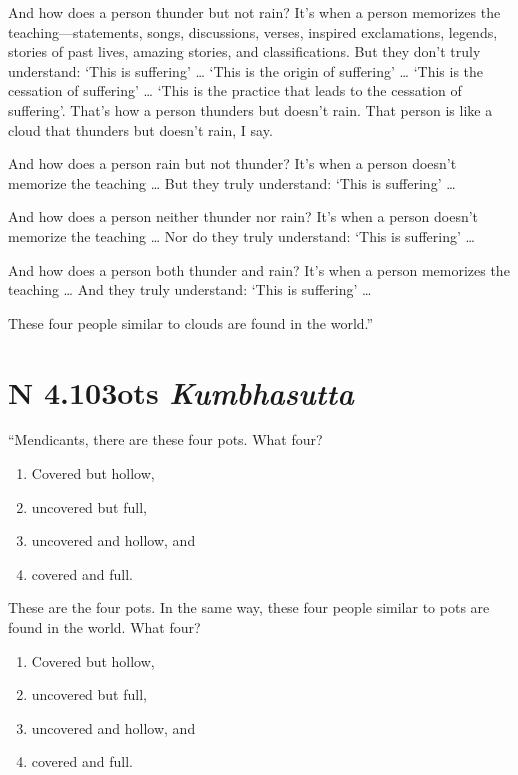 \documentclass[12pt,openany]{book}%
\newcommand*{\suttatitleacronym}[1]{\smaller[2]{#1}\vspace*{.3em}}
\newcommand*{\suttatitletranslation}[1]{\linebreak{#1}}
\newcommand*{\suttatitleroot}[1]{\linebreak\smaller[2]\itshape{#1}}
\newcommand*{\tocacronym}[1]{\hspace*{-3.3em}{#1}\quad}
\newcommand*{\toctranslation}[1]{#1}
\newcommand*{\tocroot}[1]{(\textit{#1})}
\begin{document}
And how does a person thunder but not rain? It’s when a person memorizes the teaching—statements, songs, discussions, verses, inspired exclamations, legends, stories of past lives, amazing stories, and classifications. But they don’t truly understand: ‘This is suffering’ … ‘This is the origin of suffering’ … ‘This is the cessation of suffering’ … ‘This is the practice that leads to the cessation of suffering’. That’s how a person thunders but doesn’t rain. That person is like a cloud that thunders but doesn’t rain, I say. 

And how does a person rain but not thunder? It’s when a person doesn’t memorize the teaching … But they truly understand: ‘This is suffering’ … 

And how does a person neither thunder nor rain? It’s when a person doesn’t memorize the teaching … Nor do they truly understand: ‘This is suffering’ … 

And how does a person both thunder and rain? It’s when a person memorizes the teaching … And they truly understand: ‘This is suffering’ … 

These four people similar to clouds are found in the world.” 

%
\section*{{\suttatitleacronym AN 4.103}{\suttatitletranslation Pots }{\suttatitleroot Kumbhasutta}}
\addcontentsline{toc}{section}{\tocacronym{AN 4.103} \toctranslation{Pots } \tocroot{Kumbhasutta}}

“Mendicants, there are these four pots. What four? 

\begin{enumerate}%
\item Covered but hollow, %
\item uncovered but full, %
\item uncovered and hollow, and %
\item covered and full. %
\end{enumerate}

These are the four pots. In the same way, these four people similar to pots are found in the world. What four? 

\begin{enumerate}%
\item Covered but hollow, %
\item uncovered but full, %
\item uncovered and hollow, and %
\item covered and full. %
\end{enumerate}
\end{document}

